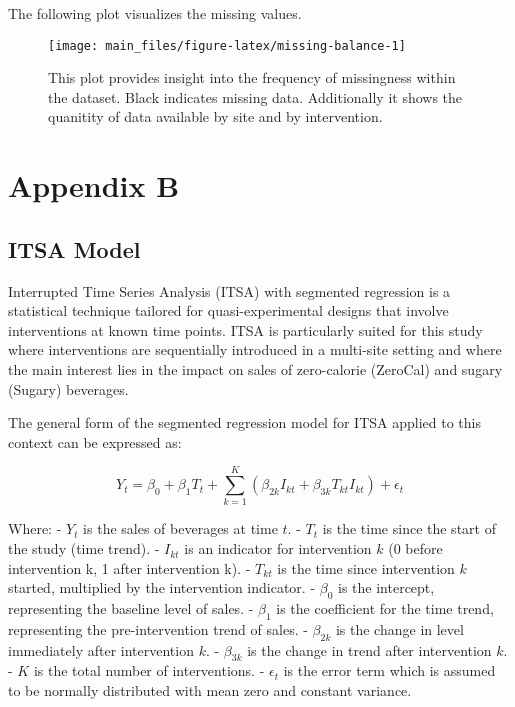 \documentclass[
]{article}
\begin{document}
The following plot visualizes the missing values.

\begin{figure}

{\centering \texttt{[image: main\_files/figure-latex/missing-balance-1]} 

}

\caption{This plot provides insight into the frequency of missingness within the dataset. Black indicates missing data. Additionally it shows the quanitity of data available by site and by intervention.}\label{fig:missing-balance}
\end{figure}

\hypertarget{appendix-b}{%
\section{Appendix B}\label{appendix-b}}

\hypertarget{itsa-model}{%
\subsection{ITSA Model}\label{itsa-model}}

Interrupted Time Series Analysis (ITSA) with segmented regression is a statistical technique tailored for quasi-experimental designs that involve interventions at known time points. ITSA is particularly suited for this study where interventions are sequentially introduced in a multi-site setting and where the main interest lies in the impact on sales of zero-calorie (ZeroCal) and sugary (Sugary) beverages.

The general form of the segmented regression model for ITSA applied to this context can be expressed as:

\[Y_t = \beta_0 + \beta_1 T_t + \sum_{k=1}^{K} (\beta_{2k} I_{kt} + \beta_{3k} T_{kt} I_{kt}) + \epsilon_t \]

Where:
- \(Y_t\) is the sales of beverages at time \(t\).
- \(T_t\) is the time since the start of the study (time trend).
- \(I_{kt}\) is an indicator for intervention \(k\) (0 before intervention k, 1 after intervention k).
- \(T_{kt}\) is the time since intervention \(k\) started, multiplied by the intervention indicator.
- \(\beta_0\) is the intercept, representing the baseline level of sales.
- \(\beta_1\) is the coefficient for the time trend, representing the pre-intervention trend of sales.
- \(\beta_{2k}\) is the change in level immediately after intervention \(k\).
- \(\beta_{3k}\) is the change in trend after intervention \(k\).
- \(K\) is the total number of interventions.
- \(\epsilon_t\) is the error term which is assumed to be normally distributed with mean zero and constant variance.
\end{document}
